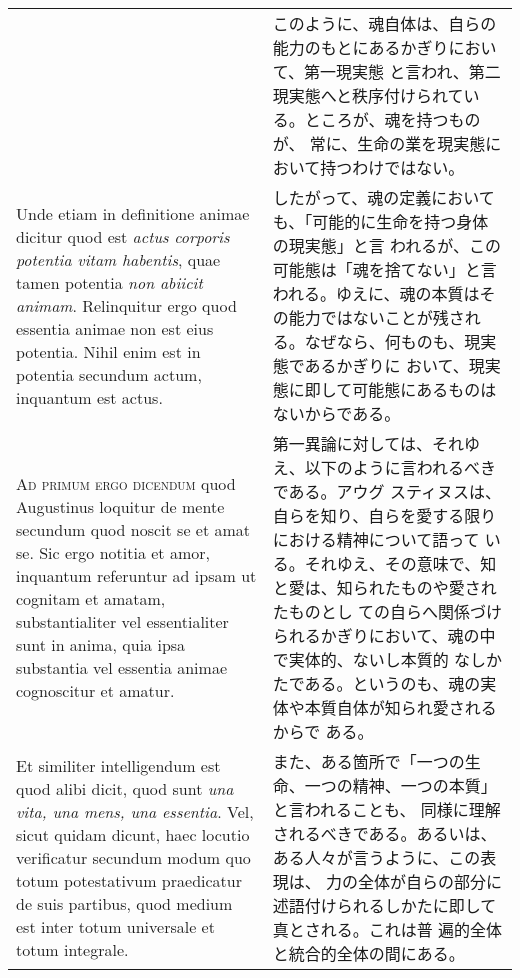 \documentclass[paper=a4paper,fontsize=10pt,jafontsize=9pt,titlepage]{jlreq}
\begin{document}
\begin{longtable}{p{21em}p{21em}}
&

このように、魂自体は、自らの能力のもとにあるかぎりにおいて、第一現実態
と言われ、第二現実態へと秩序付けられている。ところが、魂を持つものが、
常に、生命の業を現実態において持つわけではない。

\\

Unde etiam in definitione animae dicitur quod est {\itshape actus
corporis potentia vitam habentis}, quae tamen potentia {\itshape non
abiicit animam}. Relinquitur ergo quod essentia animae non est eius
potentia. Nihil enim est in potentia secundum actum, inquantum est
actus.

&

したがって、魂の定義においても、「可能的に生命を持つ身体の現実態」と言
われるが、この可能態は「魂を捨てない」と言われる。ゆえに、魂の本質はそ
の能力ではないことが残される。なぜなら、何ものも、現実態であるかぎりに
おいて、現実態に即して可能態にあるものはないからである。
 

\\



{\scshape Ad primum ergo dicendum} quod Augustinus loquitur de mente
secundum quod noscit se et amat se. Sic ergo notitia et amor,
inquantum referuntur ad ipsam ut cognitam et amatam, substantialiter
vel essentialiter sunt in anima, quia ipsa substantia vel essentia
 animae cognoscitur et amatur.

&

 第一異論に対しては、それゆえ、以下のように言われるべきである。アウグ
 スティヌスは、自らを知り、自らを愛する限りにおける精神について語って
 いる。それゆえ、その意味で、知と愛は、知られたものや愛されたものとし
 ての自らへ関係づけられるかぎりにおいて、魂の中で実体的、ないし本質的
 なしかたである。というのも、魂の実体や本質自体が知られ愛されるからで
 ある。

\\


 Et similiter intelligendum est quod alibi dicit, quod sunt {\itshape
una vita, una mens, una essentia}. Vel, sicut quidam dicunt, haec
locutio verificatur secundum modum quo totum potestativum praedicatur
de suis partibus, quod medium est inter totum universale et totum
integrale.

&

また、ある箇所で「一つの生命、一つの精神、一つの本質」と言われることも、
同様に理解されるべきである。あるいは、ある人々が言うように、この表現は、
力の全体が自らの部分に述語付けられるしかたに即して真とされる。これは普
遍的全体と統合的全体の間にある。


\end{longtable}
\end{document}

